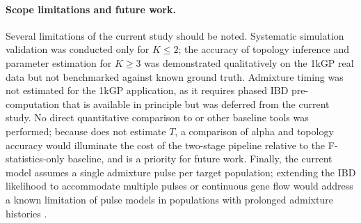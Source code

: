 \paragraph{Scope limitations and future work.}
Several limitations of the current study should be noted.
Systematic simulation validation was conducted only for $K \leq 2$; the
accuracy of topology inference and parameter estimation for $K \geq 3$ was
demonstrated qualitatively on the 1kGP real data but not benchmarked against
known ground truth.
Admixture timing was not estimated for the 1kGP application, as it requires
phased IBD pre-computation that is available in principle but was deferred
from the current study.
No direct quantitative comparison to \treemix{} or other baseline tools was
performed; because \treemix{} does not estimate $T$, a comparison of alpha
and topology accuracy would illuminate the cost of the two-stage pipeline
relative to the F-statistics-only baseline, and is a priority for future work.
Finally, the current model assumes a single admixture pulse per target
population; extending the IBD likelihood to accommodate multiple pulses
or continuous gene flow would address a known limitation of pulse models
in populations with prolonged admixture histories \citep{Loh2013}.
